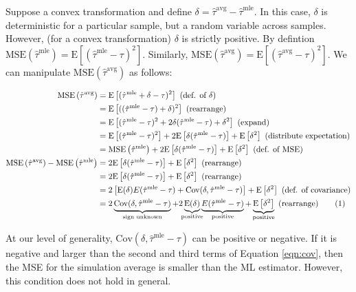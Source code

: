\documentclass[11pt]{article}
\newcommand\numberthis{\addtocounter{equation}{1}\tag{\theequation}}
\begin{document}
Suppose a convex transformation and define $\delta = \hat{\tau}^{\text{avg}}- \hat{\tau}^\text{mle}$. In this case, $\delta$ is deterministic for a particular sample, but a random variable across samples. However, (for a convex transformation) $\delta$ is strictly positive. By defintion $\text{MSE}\left( \hat{\tau}^\text{mle}\right) = \text{E}\left[ (\hat{\tau}^\text{mle} - \tau)^2\right]$. Similarly, $\text{MSE}\left( \hat{\tau}^\text{avg}\right) = \text{E}\left[ (\hat{\tau}^\text{avg} - \tau)^2\right]$. We can manipulate $\text{MSE}\left( \hat{\tau}^\text{avg}\right)$ as follows:
\begin{small}
\begin{align*}
\text{MSE}\left( \hat{\tau}^\text{avg}\right)&= \text{E}\left[ (\hat{\tau}^\text{mle} + \delta - \tau)^2\right] \text{ (def. of $\delta$)} \\
&= \text{E}\left[ ((\hat{\tau}^\text{mle} - \tau) + \delta)^2\right] \text{ (rearrange)} \\
&= \text{E}\left[ (\hat{\tau}^\text{mle} - \tau)^2 + 2\delta(\hat{\tau}^\text{mle} - \tau)  + \delta^2\right] \text{ (expand)} \\
&= \text{E}\left[ (\hat{\tau}^\text{mle} - \tau)^2 \right] + 2\text{E}\left[ \delta(\hat{\tau}^\text{mle} - \tau) \right]  + \text{E}\left[ \delta^2\right] \text{ (distribute expectation)} \\
&= \text{MSE}\left( \hat{\tau}^\text{mle}\right) + 2\text{E}\left[ \delta(\hat{\tau}^\text{mle} - \tau) \right]  + \text{E}\left[ \delta^2\right] \text{ (def. of MSE)} \\
\text{MSE}\left( \hat{\tau}^\text{avg}\right) - \text{MSE}\left( \hat{\tau}^\text{mle}\right)  &= 2\text{E}\left[ \delta(\hat{\tau}^\text{mle} - \tau) \right]  + \text{E}\left[ \delta^2\right] \text{ (rearrange)} \\
&= 2\text{E}\left[ \delta(\hat{\tau}^\text{mle} - \tau) \right]  + \text{E}\left[ \delta^2\right] \text{ (rearrange)} \\
&= 2 \left[ \text{E}(\delta)E(\hat{\tau}^\text{mle} - \tau) + \text{Cov}(\delta, \hat{\tau}^\text{mle} - \tau) \right]  + \text{E}\left[ \delta^2\right] \text{ (def. of covariance)} \\
&= 2 \underbrace{\text{Cov}(\delta, \hat{\tau}^\text{mle} - \tau)}_{\mathclap{\text{sign unknown}}}  + 2 \underbrace{\text{E}(\delta)}_{\mathclap{\text{positive}}} \underbrace{E(\hat{\tau}^\text{mle} - \tau)}_{\mathclap{\text{positive}}}  + \underbrace{\text{E}\left[ \delta^2\right]}_{\mathclap{\text{positive}}} \text{ (rearrange)} \numberthis\label{eqn:cov}\\
\end{align*}
\end{small}
\noindent At our level of generality, $\text{Cov}(\delta, \hat{\tau}^\text{mle} - \tau)$ can be positive or negative. If it is negative and larger than the second and third terms of Equation \ref{eqn:cov}, then the MSE for the simulation average is smaller than the ML estimator. However, this condition does not hold in general.
\end{document}
